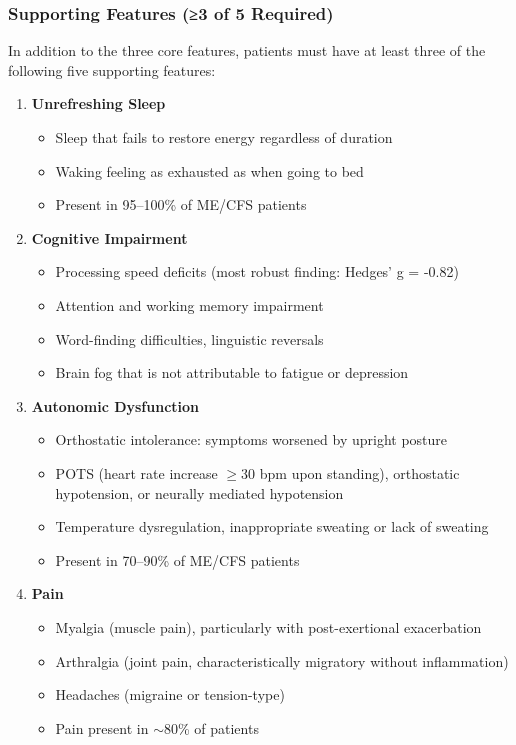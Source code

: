 \subsubsection{Supporting Features (≥3 of 5 Required)}

In addition to the three core features, patients must have at least three of the following five supporting features:

\begin{enumerate}
    \item \textbf{Unrefreshing Sleep}
    \begin{itemize}
        \item Sleep that fails to restore energy regardless of duration
        \item Waking feeling as exhausted as when going to bed
        \item Present in 95--100\% of ME/CFS patients~\cite{Jason2010sleepMECFS,Unger2016sleepPrevalence}
    \end{itemize}

    \item \textbf{Cognitive Impairment}
    \begin{itemize}
        \item Processing speed deficits (most robust finding: Hedges' g = -0.82)~\cite{Cvejic2022cognitive}
        \item Attention and working memory impairment
        \item Word-finding difficulties, linguistic reversals
        \item Brain fog that is not attributable to fatigue or depression~\cite{MCAM2024cognitive}
    \end{itemize}

    \item \textbf{Autonomic Dysfunction}
    \begin{itemize}
        \item Orthostatic intolerance: symptoms worsened by upright posture
        \item POTS (heart rate increase $\geq$30 bpm upon standing), orthostatic hypotension, or neurally mediated hypotension
        \item Temperature dysregulation, inappropriate sweating or lack of sweating
        \item Present in 70--90\% of ME/CFS patients~\cite{Newton2007autonomicDysfunction}
    \end{itemize}

    \item \textbf{Pain}
    \begin{itemize}
        \item Myalgia (muscle pain), particularly with post-exertional exacerbation
        \item Arthralgia (joint pain, characteristically migratory without inflammation)
        \item Headaches (migraine or tension-type)~\cite{Ravindran2011headache}
        \item Pain present in $\sim$80\% of patients~\cite{Unger2017pain}
    \end{itemize}


\end{enumerate}
